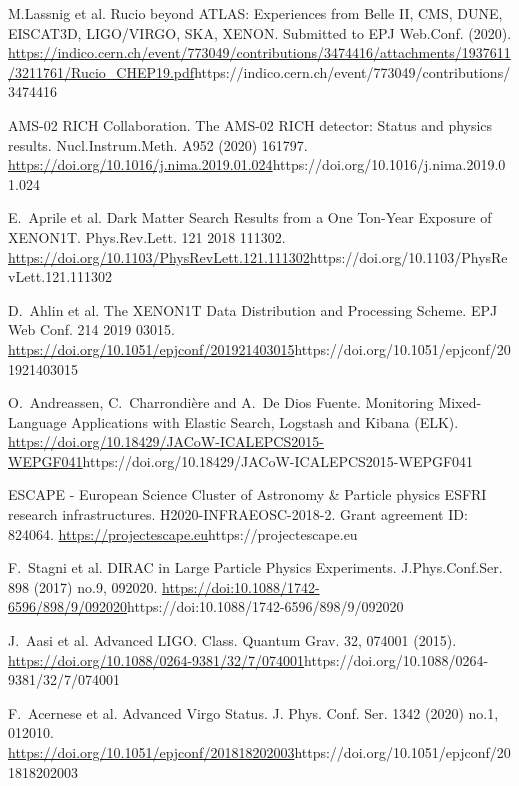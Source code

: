 \documentclass[11pt]{article}
\begin{document}
\begin{thebibliography}{99}
\begin{small}
M.Lassnig et al.
Rucio beyond ATLAS: Experiences from Belle II, CMS, DUNE, EISCAT3D, LIGO/VIRGO, SKA, XENON.
\newblock Submitted to EPJ Web.Conf. (2020).
\newblock \url{https://indico.cern.ch/event/773049/contributions/3474416/attachments/1937611/3211761/Rucio_CHEP19.pdf}{https://indico.cern.ch/event/773049/contributions/3474416}

AMS-02 RICH Collaboration.
\newblock The AMS-02 RICH detector: Status and physics results.
\newblock Nucl.Instrum.Meth. A952 (2020) 161797.
\newblock \url{https://doi.org/10.1016/j.nima.2019.01.024}{https://doi.org/10.1016/j.nima.2019.01.024}

E.~Aprile et al.
\newblock Dark Matter Search Results from a One Ton-Year Exposure of XENON1T.
\newblock Phys.Rev.Lett. 121 2018 111302.
\newblock \url{https://doi.org/10.1103/PhysRevLett.121.111302}{https://doi.org/10.1103/PhysRevLett.121.111302}

D.~Ahlin et al.
\newblock The XENON1T Data Distribution and Processing Scheme.
\newblock EPJ Web Conf. 214 2019 03015.
\newblock \url{https://doi.org/10.1051/epjconf/201921403015}{https://doi.org/10.1051/epjconf/201921403015}

O.~Andreassen, C.~Charrondière and A.~De Dios Fuente.
\newblock Monitoring Mixed-Language Applications with Elastic Search, Logstash and Kibana (ELK).
\newblock \url{https://doi.org/10.18429/JACoW-ICALEPCS2015-WEPGF041}{https://doi.org/10.18429/JACoW-ICALEPCS2015-WEPGF041}

ESCAPE - European Science Cluster of Astronomy \& Particle physics ESFRI research infrastructures.
\newblock H2020-INFRAEOSC-2018-2.
\newblock Grant agreement ID: 824064.
\newblock \url{https://projectescape.eu}{https://projectescape.eu}

F.~Stagni et al.
\newblock DIRAC in Large Particle Physics Experiments.
\newblock  J.Phys.Conf.Ser. 898 (2017) no.9, 092020.
\newblock \url{https://doi:10.1088/1742-6596/898/9/092020}{https://doi:10.1088/1742-6596/898/9/092020}

J.~Aasi et al.
\newblock Advanced LIGO.
\newblock Class. Quantum Grav. 32, 074001 (2015).
\newblock \url{https://doi.org/10.1088/0264-9381/32/7/074001}{https://doi.org/10.1088/0264-9381/32/7/074001}

F.~Acernese et al.
\newblock Advanced Virgo Status.
\newblock J. Phys. Conf. Ser. 1342 (2020) no.1,  012010.
\newblock \url{https://doi.org/10.1051/epjconf/201818202003}{https://doi.org/10.1051/epjconf/201818202003}


\end{small}
\end{thebibliography}
\end{document}
